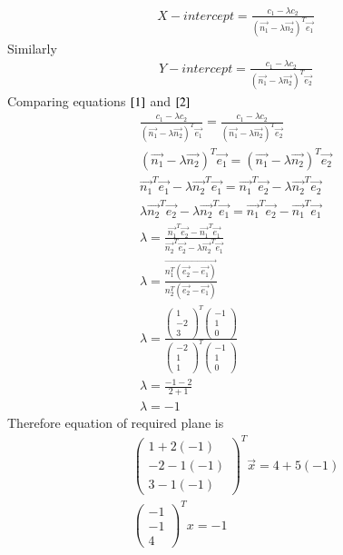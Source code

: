 \documentclass[journal]{IEEEtran}
\begin{document}
\begin{align}
    X-intercept= \frac{c_1-\lambda c_2}{(\vec{n_1}-\lambda \vec{n_2})^T\vec{e_1}}\label{1}
\end{align}
Similarly
\begin{align}
    Y-intercept=\frac{c_1-\lambda c_2}{(\vec{n_1}-\lambda \vec{n_2})^T\vec{e_2}} \label{2}
\end{align}
\newpage
Comparing equations $\eqref{1}$ and $\eqref{2}$
\begin{align}
    \frac{c_1-\lambda c_2}{(\vec{n_1}-\lambda \vec{n_2})^T\vec{e_1}}=\frac{c_1-\lambda c_2}{(\vec{n_1}-\lambda \vec{n_2})^T\vec{e_2}}\\
    (\vec{n_1}-\lambda \vec{n_2})^T\vec{e_1}=(\vec{n_1}-\lambda \vec{n_2})^T\vec{e_2}\\
    \vec{n_1}^T\vec{e_1}-\lambda\vec{n_2}^T\vec{e_1}=\vec{n_1}^T\vec{e_2}-\lambda\vec{n_2}^T\vec{e_2}\\
    \lambda\vec{n_2}^T\vec{e_2}-\lambda\vec{n_2}^T\vec{e_1}=\vec{n_1}^T\vec{e_2}-\vec{n_1}^T\vec{e_1}\\
    \lambda=\frac{\vec{n_1}^T\vec{e_2}-\vec{n_1}^T\vec{e_1}}{\vec{n_2}^T\vec{e_2}-\lambda\vec{n_2}^T\vec{e_1}}\\
    \lambda=\frac{\vec{n_1^T(\vec{e_2}-\vec{e_1})}}{n_2^T(\vec{e_2}-\vec{e_1})}\\
    \lambda=\frac{\begin{pmatrix}1\\-2\\3\end{pmatrix}^T\begin{pmatrix}-1\\1\\0\end{pmatrix}}{\begin{pmatrix}-2\\1\\1\end{pmatrix}^T\begin{pmatrix}-1\\1\\0\end{pmatrix}}\\
    \lambda=\frac{-1-2}{2+1}\\
    \lambda=-1
\end{align}
Therefore equation of required plane is
\begin{align}
    \begin{pmatrix}1+2(-1)\\-2-1(-1)\\3-1(-1)\end{pmatrix}^T\vec{x}=4+5(-1)\\
    \begin{pmatrix}-1\\-1\\4\end{pmatrix}^Tx=-1
\end{align}
\end{document}
